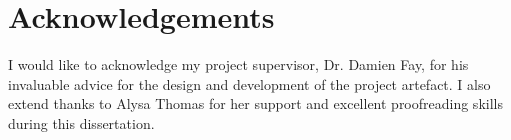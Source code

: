 \chapter*{Acknowledgements}
I would like to acknowledge my project supervisor, Dr. Damien Fay, for his invaluable advice for the design and development of the project artefact.
I also extend thanks to Alysa Thomas for her support and excellent proofreading skills during this dissertation.
